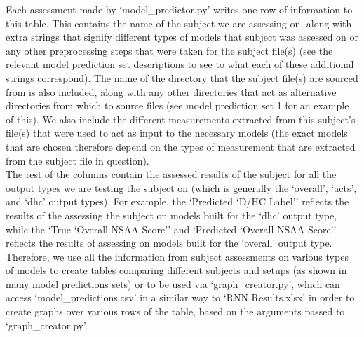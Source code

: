\documentclass[12pt,twoside]{report}
\begin{document}
\quad Each assessment made by ‘model\_predictor.py’ writes one row of information to this table. This contains the name of the subject we are assessing on, along with extra strings that signify different types of models that subject was assessed on or any other preprocessing steps that were taken for the subject file(s) (see the relevant model prediction set descriptions to see to what each of these additional strings correspond). The name of the directory that the subject file(s) are sourced from is also included, along with any other directories that act as alternative directories from which to source files (see model prediction set 1 for an example of this). We also include the different measurements extracted from this subject’s file(s) that were used to act as input to the necessary models (the exact models that are chosen therefore depend on the types of measurement that are extracted from the subject file in question).\\

\quad The rest of the columns contain the assessed results of the subject for all the output types we are testing the subject on (which is generally the ‘overall’, ‘acts’, and ‘dhc’ output types). For example, the ‘Predicted ‘D/HC Label’’ reflects the results of the assessing the subject on models built for the ‘dhc’ output type, while the ‘True ‘Overall NSAA Score’’ and ‘Predicted ‘Overall NSAA Score’’ reflects the results of assessing on models built for the ‘overall’ output type. Therefore, we use all the information from subject assessments on various types of models to create tables comparing different subjects and setups (as shown in many model predictions sets) or to be used via ‘graph\_creator.py’, which can access ‘model\_predictions.csv’ in a similar way to ‘RNN Results.xlsx’ in order to create graphs over various rows of the table, based on the arguments passed to ‘graph\_creator.py’.









\end{document}

